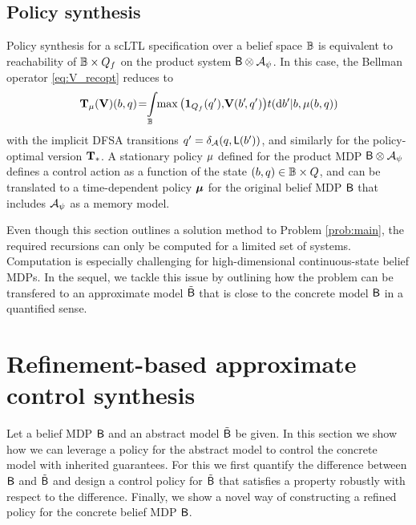 \documentclass{ifacconf}
\newcommand{\red}[1]{{\color{red} #1}}
\begin{document}
\subsection{Policy synthesis}
Policy synthesis for a scLTL specification over a belief space $\mathbb{B}$ is equivalent to reachability of $\mathbb{B}\times Q_f$ on the product system $\mathsf{B} \otimes \mathcal{A}_\psi$. In this case, the Bellman operator \eqref{eq:V_recopt} reduces to
\begin{equation}
\label{eq:V_recopt_inf_mu}
  \Bel_\pol (\mathbf V)(b,q)\! = \hspace{-1mm} \int_{\Xb} \hspace{-1mm} \max \left( \mathbf 1_{Q_f}(q'), \!\mathbf V( b'\!, q') \right)\! {\tr}(\mathrm{d} b' |b,\pol(b,q))\!
\end{equation}
with the implicit DFSA transitions  $q' =\delta_{\mathcal{A}}(q,\mathsf{L}(b'))$, %
and similarly for the policy-optimal version ${\mathbf {T}}_\ast$. A stationary policy ${\mu}$ defined for the product MDP $\mathsf{B} \otimes \mathcal{A}_\psi$ defines a control action as a function of the state $(b,q) \in \mathbb{B} \times Q$, and can be translated to a time-dependent policy ${\boldsymbol{\mu}}$ for the original belief MDP $\mathsf{B}$ that includes $\mathcal{A}_\psi$ as a memory model.

Even though this section outlines a solution method to Problem \ref{prob:main}, the required recursions can only be computed for a limited set of systems.
Computation is especially challenging for high-dimensional continuous-state belief MDPs. In the sequel, we tackle this issue by outlining how the problem can be transfered to an approximate model $\tilde {\mathsf{B}}$ that is close to the concrete model $\mathsf{B}$ in a quantified sense.


\section{Refinement-based approximate control synthesis}
\label{sec:refinement}

Let a belief MDP $\mathsf{B}$ and an abstract model $\tilde {\mathsf{B}}$ be given. In this section we show how we can leverage a policy for the abstract model to control the concrete model with inherited guarantees. For this we first quantify the difference between $\mathsf{B}$ and $\tilde {\mathsf{B}}$ and design a control policy for $\tilde {\mathsf{B}}$ that satisfies a property robustly with respect to the difference. Finally, we show a novel way of constructing a refined policy for the concrete belief MDP $\mathsf{B}$.
\end{document}
